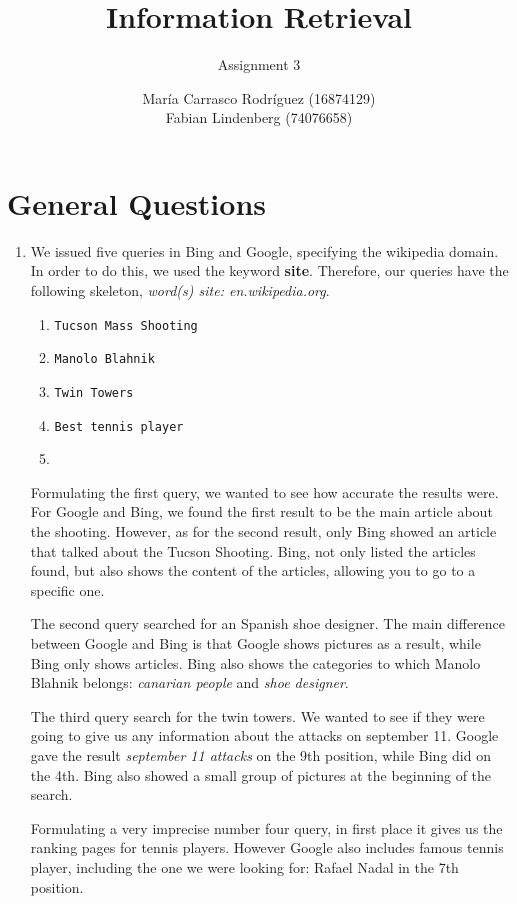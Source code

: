 \documentclass[a4paper,11pt,oneside]{book}
\title{Information Retrieval }
\subtitle{Assignment 3}
\author{ María Carrasco Rodríguez (16874129) \\
		Fabian Lindenberg (74076658)}
\begin{document}
\kostspieligmaketitle

\tableofcontents
\pagebreak

\chapter{General Questions}

\begin{enumerate}\item We issued five queries in Bing and Google, specifying the wikipedia domain. In order to do this, we used the keyword {\bf site}. Therefore, our queries have the following skeleton, {\it word(s) site: en.wikipedia.org}.
		\begin{enumerate}
			\renewcommand{\labelenumii}{\Roman{enumii}}
			\item \texttt{Tucson Mass Shooting}
			\item \texttt{Manolo Blahnik}
			\item \texttt{Twin Towers}
			\item \texttt{Best tennis player}
			\item \texttt{}
		\end{enumerate}
	Formulating the first query, we wanted to see how accurate the results were. For Google and Bing, we found the first result to be the main article about the shooting. However, as for the second result, only Bing showed an article that talked about the Tucson Shooting. Bing, not only listed the articles found, but also shows the content of the articles, allowing you to go to a specific one.

	The second query searched for an Spanish shoe designer. The main difference between Google and Bing is that Google shows pictures as a result, while Bing only shows articles. Bing also shows the categories to which Manolo Blahnik belongs: {\it canarian people} and {\it shoe designer}.

	The third query search for the twin towers. We wanted to see if they were going to give us any information about the attacks on september 11. Google gave the result {\it september 11 attacks} on the 9th position, while Bing did on the 4th. Bing also showed a small group of pictures at the beginning of the search.

	Formulating a very imprecise number four query, in first place it gives us the ranking pages for tennis players. However Google also includes famous tennis player, including the one we were looking for: Rafael Nadal in the 7th position.


\end{enumerate}
\end{document}
